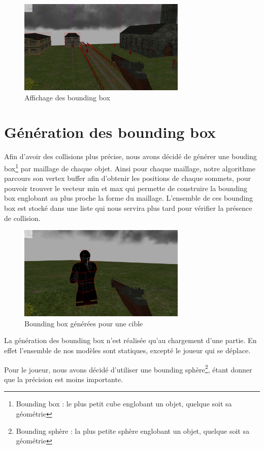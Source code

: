 \documentclass[11pt]{report}
\begin{document}
\begin{figure}[htbp]
\centering
\includegraphics[width=8cm]{affichage-box.png}
\caption{Affichage des bounding box}
\end{figure}

\section{Génération des bounding box}

Afin d'avoir des collisions plus précise, nous avons décidé de générer une bouding box\footnote{Bounding box : le plus petit cube englobant un objet, quelque soit sa géométrie} par maillage de chaque objet. Ainsi pour chaque maillage, notre algorithme parcours son vertex buffer afin d'obtenir les positions de chaque sommets, pour pouvoir trouver le vecteur min et max qui permette de construire la bounding box englobant au plus proche la forme du maillage. L'ensemble de ces bounding box est stocké dans une liste qui nous servira plus tard pour vérifier la présence de collision.

\begin{figure}[htbp]
\centering
\includegraphics[width=8cm]{multiple-box.png}
\caption{Bounding box générées pour une cible}
\end{figure}

La génération des bounding box n'est réalisée qu'au chargement d'une partie. En effet l'ensemble de nos modèles sont statiques, excepté le joueur qui se déplace.

Pour le joueur, nous avons décidé d'utiliser une bounding sphère\footnote{Bounding sphère : la plus petite sphère englobant un objet, quelque soit sa géométrie}, étant donner que la précision est moins importante.
\end{document}
